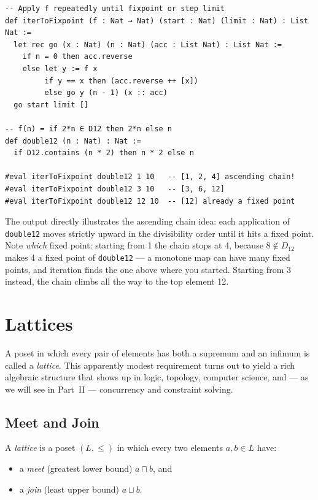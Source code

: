 \documentclass[12pt, a4paper, openright]{book}
\theoremstyle{thmstyle}
\theoremstyle{defstyle}
\newcommand{\lc}[1]{\texttt{#1}}
\newenvironment{defbox}[1][]{%
  \begin{tcolorbox}[defbox, title={Definition\ifx\\#1\\\else\ --- #1\fi}]%
}{\end{tcolorbox}}
\begin{document}
\begin{verbatim}
-- Apply f repeatedly until fixpoint or step limit
def iterToFixpoint (f : Nat → Nat) (start : Nat) (limit : Nat) : List Nat :=
  let rec go (x : Nat) (n : Nat) (acc : List Nat) : List Nat :=
    if n = 0 then acc.reverse
    else let y := f x
         if y == x then (acc.reverse ++ [x])
         else go y (n - 1) (x :: acc)
  go start limit []

-- f(n) = if 2*n ∈ D12 then 2*n else n
def double12 (n : Nat) : Nat :=
  if D12.contains (n * 2) then n * 2 else n

#eval iterToFixpoint double12 1 10   -- [1, 2, 4] ascending chain!
#eval iterToFixpoint double12 3 10   -- [3, 6, 12]
#eval iterToFixpoint double12 12 10  -- [12] already a fixed point
\end{verbatim}

The output directly illustrates the ascending chain idea: each application of
\lc{double12} moves strictly upward in the divisibility order until it hits a
fixed point. Note \emph{which} fixed point: starting from 1 the chain stops at
4, because $8 \notin D_{12}$ makes 4 a fixed point of \lc{double12} --- a
monotone map can have many fixed points, and iteration finds the one above
where you started. Starting from 3 instead, the chain climbs all the way to
the top element 12.

\chapter{Lattices}

A poset in which every pair of elements has both a supremum and an infimum
is called a \emph{lattice}. This apparently modest requirement turns out to
yield a rich algebraic structure that shows up in logic, topology, computer
science, and --- as we will see in Part~II --- concurrency and constraint solving.

\section{Meet and Join}

\begin{defbox}[Lattice]
  A \emph{lattice} is a poset $(L, \leq)$ in which every two elements
  $a, b \in L$ have:
  \begin{itemize}[nosep]
    \item a \emph{meet} (greatest lower bound) $a \sqcap b$, and
    \item a \emph{join} (least upper bound) $a \sqcup b$.
  \end{itemize}
\end{defbox}
\end{document}
